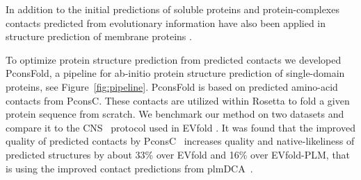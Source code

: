 \documentclass{bioinfo}
\begin{document}
In addition to the initial predictions of soluble proteins \cite[]{marks_protein_2011}
and protein-complexes \cite[]{Schug20018738}  contacts predicted from evolutionary information
have also been applied in structure prediction of membrane proteins
\cite[]{hopf_three-dimensional_2012, nugent_accurate_2012}.

To optimize protein structure prediction from predicted contacts we
developed PconsFold, a pipeline for ab-initio protein structure
prediction of  single-domain proteins, see Figure~\ref{fig:pipeline}. PconsFold is based on predicted
amino-acid contacts from PconsC. These contacts are utilized within
Rosetta to fold a given protein sequence from scratch. We benchmark
our method on two datasets and compare it to the CNS~\cite[]{Brunger18007608} protocol used in EVfold
\cite[]{marks_protein_2011}. It was found that the improved quality of predicted contacts
by PconsC~\cite[]{skwark_PconsC:_2013} increases quality and
native-likeliness of predicted structures by about 33\% over 
EVfold and 16\% over EVfold-PLM, that is using the improved contact
predictions from plmDCA~\cite[]{ekeberg_improved_2013}.
\end{document}
